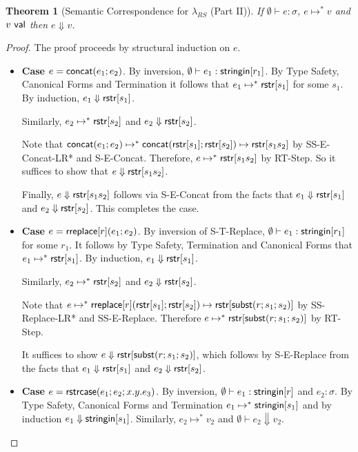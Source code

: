 \documentclass[11pt,leqno]{article}
\newtheorem{trthm}[tr]{Theorem}
\theoremstyle{definition}
\newcommand{\lambdas}{\lambda_{RS}}
\newcommand{\val}{{\sf val}}
\newcommand{\stringin}[1]{{\sf stringin}[#1]}
\newcommand{\lsubst}[3]{{\sf subst}(#1;#2;#3)} %
\newcommand{\strcase}[3]{ {\sf rstrcase}(#1; #2; #3)}
\newcommand{\sreduces}{ \Downarrow }
\begin{document}
\begin{trthm}[Semantic Correspondence for $\lambdas$ (Part II)]
If $\emptyset\vdash e : \sigma$, $e \mapsto^* v$ and $v \ \val$ then $e \sreduces v$.  
\end{trthm}
\begin{proof}
The proof proceeds by structural induction on $e$.

\begin{itemize}[label=$ $,itemsep=1ex]

\item \textbf{Case $e = {\sf concat}(e_1;e_2)$}.
By inversion, $\emptyset\vdash e_1 : \stringin{r_1}$.
By Type Safety, Canonical Forms and Termination it follows that $e_1 \mapsto^* {\sf rstr}[s_1]$ for some $s_1$.
By induction, $e_1 \sreduces \rstr{s_1}$.

Similarly, $e_2 \mapsto^* {\sf rstr}[s_2]$ and $e_2 \sreduces \rstr{s_2}$.

Note that ${\sf concat}(e_1;e_2) \mapsto^* {\sf concat}({\sf rstr}[s_1];{\sf rstr}[s_2]) \mapsto {\sf rstr}[s_1s_2]$ by SS-E-Concat-LR* and S-E-Concat.
Therefore, $e \mapsto^* {\sf rstr}[s_1s_2]$ by RT-Step. So it suffices to show that $e \sreduces \rstr{s_1s_2}$.

Finally, $e \sreduces \rstr{s_1s_2}$ follows via S-E-Concat from the facts that $e_1 \sreduces \rstr{s_1}$ and $e_2 \sreduces \rstr{s_2}$.
This completes the case. 

\item \textbf{Case $e = {\sf rreplace}[r](e_1;e_2)$}.
By inversion of S-T-Replace, $\emptyset\vdash e_1 : \stringin{r_1}$ for some $r_1$.
It follows by Type Safety, Termination and Canonical Forms that $e_1 \mapsto^* {\sf rstr}[s_1]$.
By induction, $e_1 \sreduces \rstr{s_1}$.

Similarly, $e_2 \mapsto^* {\sf rstr}[s_2]$ and $e_2 \sreduces \rstr{s_2}$.

Note that $e \mapsto^* \rreplace{r}{\rstr{s_1}}{\rstr{s_2}} \mapsto \rstr{\lsubst{r}{s_1}{s_2}}$ by SS-Replace-LR* and SS-E-Replace.
Therefore $e \mapsto^* \rstr{\lsubst{r}{s_1}{s_2}}$ by RT-Step. 

It suffices to show $e \sreduces \rstr{\lsubst{r}{s_1}{s_2}}$, which follows by S-E-Replace from the facts that $e_1 \sreduces \rstr{s_1}$ and
$e_2 \sreduces \rstr{s_2}$.


\item \textbf{Case $e = \strcase{e_1}{e_2}{x.y.e_3}$}.
By inversion, $\emptyset\vdash e_1 : \stringin{r}$ and $e_2 : \sigma$.
By Type Safety, Canonical Forms and Termination $e_1 \mapsto^* \stringin{s_1}$ and by induction $e_1 \sreduces \stringin{s_1}$.
Similarly, $e_2 \mapsto^* v_2$ and $\emptyset\vdash e_2 \sreduces v_2$.


\end{itemize}
\end{proof}
\end{document}
